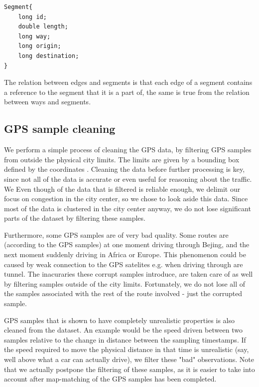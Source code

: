 \begin{lstlisting}[style=java, caption=Datastructure for a segment]
Segment{
	long id;
	double length;
	long way;
	long origin;
	long destination;
}
\end{lstlisting}

The relation between edges and segments is that each edge of a segment contains a reference to the segment that it is a part of, the same is true from the relation between ways and segments.

\subsection{GPS sample cleaning}
We perform a simple process of cleaning the GPS data, by filtering GPS samples from outside the physical city limits. The limits are given by a bounding box defined by the coordinates . Cleaning the data before further processing is key, since not all of the data is accurate or even useful for reasoning about the traffic. We Even though of the data that is filtered is reliable enough, we delimit our focus on congestion in the city center, so we chose to look aside this data. Since most of the data is clustered in the city center anyway, we do not lose significant parts of the dataset by filtering these samples.

Furthermore, some GPS samples are of very bad quality. Some routes are (according to the GPS samples) at one moment driving through Bejing, and the next moment suddenly driving in Africa or Europe. This phenomenon could be caused by weak connection to the GPS satelites e.g. when driving through are tunnel. The inacuraries these corrupt samples introduce, are taken care of as well by filtering samples outside of the city limits. Fortunately, we do not lose all of the samples associated with the rest of the route involved - just the corrupted sample.

GPS samples that is shown to have completely unrealistic properties is also cleaned from the dataset. An example would be the speed driven between two samples relative to the change in distance between the sampling timestamps. If the speed required to move the physical distance in that time is unrealistic (say, well above what a car can actually drive), we filter these "bad" observations. Note that we actually postpone the filtering of these samples, as it is easier to take into account after map-matching of the GPS samples has been completed. 

